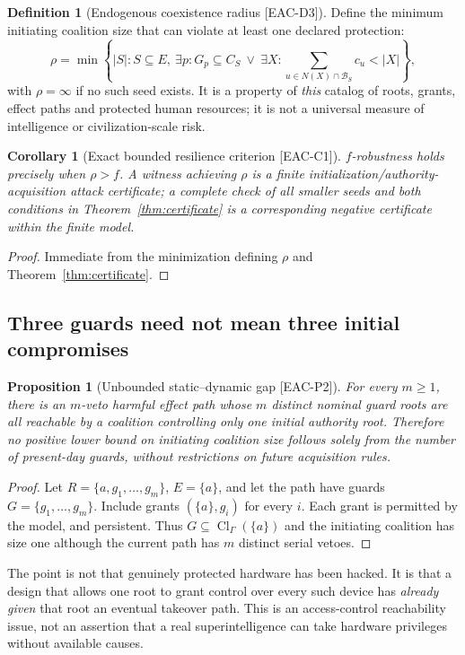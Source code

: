 \documentclass[11pt,a4paper]{article}
\newtheorem{proposition}[theorem]{Proposition}
\newtheorem{corollary}[theorem]{Corollary}
\theoremstyle{definition}\newtheorem{definition}{Definition}
\newcommand{\Cl}{\operatorname{Cl}}
\newcommand{\Rules}{\Gamma}
\newcommand{\Banks}{\mathcal B}
\newcommand{\idtag}[1]{\textnormal{\textsf{[#1]}}}
\begin{document}
\begin{definition}[Endogenous coexistence radius \idtag{EAC-D3}]
Define the minimum initiating coalition size that can violate at least one declared protection:
\begin{equation}
\rho=\min\left\{|S|:S\subseteq E,\ \exists p:G_p\subseteq C_S\ \lor\ \exists X:
\sum_{u\in N(X)\cap\Banks_S}c_u<|X|\right\},
\label{eq:radius}
\end{equation}
with $\rho=\infty$ if no such seed exists. It is a property of \emph{this} catalog of roots, grants, effect paths and protected human resources; it is not a universal measure of intelligence or civilization-scale risk.
\end{definition}
\begin{corollary}[Exact bounded resilience criterion \idtag{EAC-C1}]
$ f$-robustness holds precisely when $\rho>f$. A witness achieving $\rho$ is a finite initialization/authority-acquisition attack certificate; a complete check of all smaller seeds and both conditions in Theorem~\ref{thm:certificate} is a corresponding negative certificate within the finite model.
\end{corollary}
\begin{proof}Immediate from the minimization defining $\rho$ and Theorem~\ref{thm:certificate}.\end{proof}

\subsection{Three guards need not mean three initial compromises}
\begin{proposition}[Unbounded static--dynamic gap \idtag{EAC-P2}]
For every $m\ge1$, there is an $m$-veto harmful effect path whose $m$ distinct nominal guard roots are all reachable by a coalition controlling only one initial authority root. Therefore no positive lower bound on initiating coalition size follows solely from the number of present-day guards, without restrictions on future acquisition rules.
\end{proposition}
\begin{proof}
Let $R=\{a,g_1,\ldots,g_m\}$, $E=\{a\}$, and let the path have guards $G=\{g_1,\ldots,g_m\}$. Include grants $(\{a\},g_i)$ for every $i$. Each grant is permitted by the model, and persistent. Thus $G\subseteq\Cl_\Rules(\{a\})$ and the initiating coalition has size one although the current path has $m$ distinct serial vetoes.
\end{proof}
The point is not that genuinely protected hardware has been hacked. It is that a design that allows one root to grant control over every such device has \emph{already given} that root an eventual takeover path. This is an access-control reachability issue, not an assertion that a real superintelligence can take hardware privileges without available causes.
\end{document}
